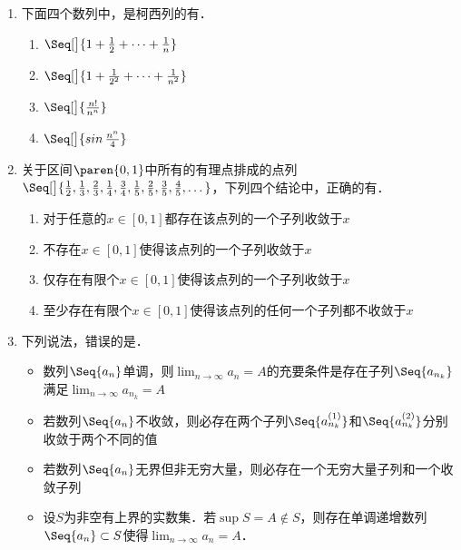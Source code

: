 \documentclass[a4paper,punct=CCT]{ctexbook}
\renewcommand*{\enumparen}[1]{（\makebox[0.6em][c]{\normalfont#1}）}
\theoremstyle{definition}
\theoremstyle{remark}
\newif\ifshowsol
\begin{document}
\begin{enumerate}
\item 下面四个数列中，是柯西列的有\uline{\makebox[6em]{%
      \ifshowsol
      \enumparen{2}%
      \enumparen{3}
      \fi}}．
  \begin{enumerate}
    \renewcommand{\labelenumii}{\enumparen{\arabic{enumii}}}
  \item \(\Seq[\big]{1 + \frac12 + \dots + \frac1n}\)
  \item \(\Seq[\big]{1 + \frac1{2^2} + \dots + \frac1{n^2}}\)
  \item \(\Seq[\big]{\frac{n!}{n^n}}\)
  \item \(\Seq[\big]{\sin\frac{n^n}{4}}\)
  \end{enumerate}

\item 关于区间\(\paren{0,1}\)中所有的有理点排成的点列\(\Seq[\big]{\frac12, \frac13, \frac23, \frac14, \frac34, \frac15, \frac25, \frac35, \frac45, \dots}\)，下列四个结论中，正确的有\uline{\makebox[6em]{%
      \ifshowsol
      \enumparen{1}
      \fi}}．
  \begin{enumerate}
    \renewcommand{\labelenumii}{\enumparen{\arabic{enumii}}}
  \item 对于任意的\(x \in [0,1]\)都存在该点列的一个子列收敛于\(x\)
  \item 不存在\(x \in [0,1]\)使得该点列的一个子列收敛于\(x\)
  \item 仅存在有限个\(x \in [0,1]\)使得该点列的一个子列收敛于\(x\)
  \item 至少存在有限个\(x \in [0,1]\)使得该点列的任何一个子列都不收敛于\(x\)
  \end{enumerate}

\item 下列说法，错误的是\uline{\makebox[6em]{}}．
  \begin{itemize}
    \renewcommand{\labelitemi}{\faCircleThin}
  \item 数列\(\Seq{a_n}\)单调，则\(\lim_{n\to\infty} a_n = A\)的充要条件是存在子列\(\Seq{a_{n_k}}\)满足\(\lim_{n\to\infty} a_{n_k} = A\)
    \ifshowsol
  \item[\faCircle]
    \else
  \item
    \fi
    若数列\(\Seq{a_n}\)不收敛，则必存在两个子列\(\Seq{a_{n_k}^{(1)}}\)和\(\Seq{a_{n_k}^{(2)}}\)分别收敛于两个不同的值
  \item 若数列\(\Seq{a_n}\)无界但非无穷大量，则必存在一个无穷大量子列和一个收敛子列
  \item 设\(S\)为非空有上界的实数集．若\(\sup S = A \notin S\)，则存在单调递增数列\(\Seq{a_n} \subset S\)使得\(\lim_{n\to\infty} a_n = A\)．
  \end{itemize}
\end{enumerate}
\fi
\end{document}
